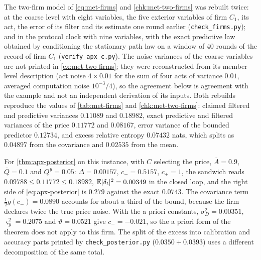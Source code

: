 \begin{numcheck}\label{chk:apx-firms}
The two-firm model of \cref{eq:met-firms} and \cref{chk:met-two-firms} was rebuilt twice: at the coarse level with eight variables, the five exterior variables of firm $C_1$, its act, the error of its filter and its estimate one round earlier (\texttt{check\_firms.py}); and in the protocol clock with nine variables, with the exact predictive law obtained by conditioning the stationary path law on a window of $40$ rounds of the record of firm $C_1$ (\texttt{verify\_apx\_c.py}). The noise variances of the coarse variables are not printed in \cref{ex:met-two-firms}; they were reconstructed from its member-level description (act noise $4\times0.01$ for the sum of four acts of variance $0.01$, averaged computation noise $10^{-3}/4$), so the agreement below is agreement with the example and not an independent derivation of its inputs. Both rebuilds reproduce the values of \cref{tab:met-firms} and \cref{chk:met-two-firms}: claimed filtered and predictive variances $0.11089$ and $0.18982$, exact predictive and filtered variances of the price $0.11772$ and $0.08167$, error variance of the bounded predictor $0.12734$, and excess relative entropy $0.07432$ nats, which splits as $0.04897$ from the covariance and $0.02535$ from the mean.

For \cref{thm:apx-posterior} on this instance, with $C$ selecting the price, $\bar A=0.9$, $\bar Q=0.1$ and $Q^y=0.05$: $\Delta=0.00157$, $c_-=0.5157$, $c_+=1$, the sandwich reads $0.09788\le0.11772\le0.18982$, $\mathbb{E}\lvert\delta_t\rvert^2=0.00349$ in the closed loop, and the right side of \cref{eq:apx-posterior} is $0.279$ against the exact $0.0743$. The covariance term $\frac12g(c_-)=0.0890$ accounts for about a third of the bound, because the firm declares twice the true price noise. With the a priori constants, $\sigma_D^2=0.00351$, $\varsigma_y^2=0.2075$ and $\vartheta=0.0521$ give $c_-=-0.021$, so the a priori form of the theorem does not apply to this firm. The split of the excess into calibration and accuracy parts printed by \texttt{check\_posterior.py} ($0.0350+0.0393$) uses a different decomposition of the same total.
\end{numcheck}


